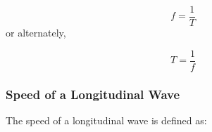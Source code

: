     \begin{equation}
    f=\frac{1}{T}\tag{8.1}
      \end{equation}
        \label{m38782*id291706}or alternately,\par 
        \label{m38782*id292764}\nopagebreak\noindent{}
    \begin{equation}
    T=\frac{1}{f}\tag{8.2}
      \end{equation}
      \label{m38782*uid11}
            \subsubsection{ Speed of a Longitudinal Wave}
            \nopagebreak
            \label{m38782*id292794}The speed of a longitudinal wave is defined as:\par 
        \label{m38782*id292798}\nopagebreak\noindent{}
          

